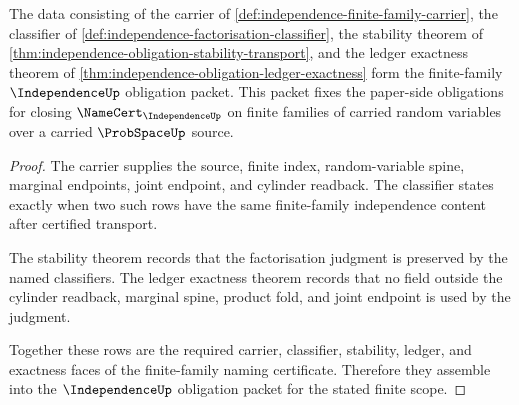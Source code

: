 \begin{theorem}
\label{thm:independence-obligation-certificate-packet}
The data consisting of the carrier of \autoref{def:independence-finite-family-carrier}, the classifier of \autoref{def:independence-factorisation-classifier}, the stability theorem of \autoref{thm:independence-obligation-stability-transport}, and the ledger exactness theorem of \autoref{thm:independence-obligation-ledger-exactness} form the finite-family $\IndependenceUp$ obligation packet. This packet fixes the paper-side obligations for closing $\NameCert_{\IndependenceUp}$ on finite families of carried random variables over a carried $\ProbSpaceUp$ source.
\end{theorem}
\begin{proof}
The carrier supplies the source, finite index, random-variable spine, marginal endpoints, joint endpoint, and cylinder readback. The classifier states exactly when two such rows have the same finite-family independence content after certified transport.

The stability theorem records that the factorisation judgment is preserved by the named classifiers. The ledger exactness theorem records that no field outside the cylinder readback, marginal spine, product fold, and joint endpoint is used by the judgment.

Together these rows are the required carrier, classifier, stability, ledger, and exactness faces of the finite-family naming certificate. Therefore they assemble into the $\IndependenceUp$ obligation packet for the stated finite scope.
\end{proof}

